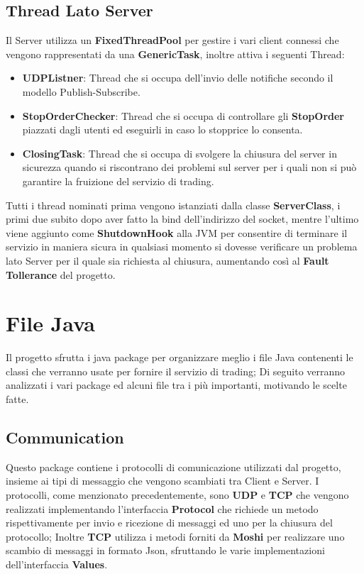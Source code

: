 \documentclass{article}
\begin{document}
\subsection{Thread Lato Server}
Il Server utilizza un \textbf{FixedThreadPool} per gestire i vari client connessi che vengono rappresentati da una \textbf{GenericTask}, inoltre attiva i seguenti Thread:
\begin{itemize}
  \item \textbf{UDPListner}: Thread che si occupa dell'invio delle notifiche secondo il modello Publish-Subscribe.
  \item \textbf{StopOrderChecker}: Thread che si occupa di controllare gli \textbf{StopOrder} piazzati dagli utenti ed eseguirli in caso lo stopprice lo consenta.
  \item \textbf{ClosingTask}: Thread che si occupa di svolgere la chiusura del server in sicurezza quando si riscontrano dei problemi sul server per i quali non si può garantire la fruizione del servizio di trading.
\end{itemize}
Tutti i thread nominati prima vengono istanziati dalla classe \textbf{ServerClass}, i primi due subito dopo aver fatto la bind dell'indirizzo del socket, mentre l'ultimo viene aggiunto come \textbf{ShutdownHook} alla JVM per consentire di terminare il servizio in maniera sicura in qualsiasi momento si dovesse verificare un problema lato Server per il quale sia richiesta al chiusura, aumentando così al \textbf{Fault Tollerance} del progetto. 
\newpage

\section{File Java}
Il progetto sfrutta i java package per organizzare meglio i file Java contenenti le classi che verranno usate per fornire il servizio di trading; Di seguito verranno analizzati i vari package ed alcuni file tra i più importanti, motivando le scelte fatte.
\subsection{Communication}
Questo package contiene i protocolli di comunicazione utilizzati dal progetto, insieme ai tipi di messaggio che vengono scambiati tra Client e Server.
I protocolli, come menzionato precedentemente, sono \textbf{UDP} e \textbf{TCP} che vengono realizzati implementando l'interfaccia \textbf{Protocol} che richiede un metodo rispettivamente per invio e ricezione di messaggi ed uno per la chiusura del protocollo;
Inoltre \textbf{TCP} utilizza i metodi forniti da \textbf{Moshi} per realizzare uno scambio di messaggi in formato Json, sfruttando le varie implementazioni dell'interfaccia \textbf{Values}.
\end{document}
